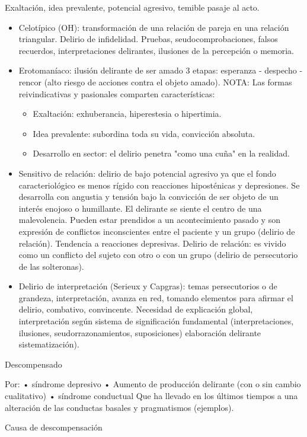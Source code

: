 \documentclass{scrbook}
\begin{document}
Exaltación, idea prevalente, potencial agresivo, temible pasaje al acto.
\begin{itemize}
	\item Celotípico (OH): transformación de una relación de pareja en una relación triangular. Delirio de infidelidad. Pruebas, seudocomprobaciones, falsos recuerdos, interpretaciones delirantes, ilusiones de la percepción o memoria.
	\item Erotomaníaco: ilusión delirante de ser amado 3 etapas: esperanza - despecho - rencor (alto riesgo de acciones contra el objeto amado). NOTA: Las formas reivindicativas y pasionales comparten características:
	\begin{itemize}
		\item Exaltación: exhuberancia, hiperestesia o hipertimia.
		\item Idea prevalente: subordina toda su vida, convicción absoluta.
		\item Desarrollo en sector: el delirio penetra "como una cuña" en la realidad.
	\end{itemize}
	\item  Sensitivo de relación: delirio de bajo potencial agresivo ya que el fondo caracteriológico es menos rígido con reacciones hiposténicas y depresiones. Se desarrolla con angustia y tensión bajo la convicción de ser objeto de un interés enojoso o humillante. El delirante se siente el centro de una malevolencia. Pueden estar prendidos a un acontecimiento pasado y son expresión de conflictos inconscientes entre el paciente y un grupo (delirio de relación). Tendencia a reacciones depresivas. Delirio de relación: es vivido como un conflicto del sujeto con otro o con un grupo (delirio de persecutorio de las solteronas).
	\item Delirio de interpretación (Serieux y Capgras): temas persecutorios o de grandeza, interpretación, avanza en red, tomando elementos para afirmar el delirio, combativo, convincente. Necesidad de explicación global, interpretación según sistema de significación fundamental (interpretaciones, ilusiones, seudorrazonamientos, suposiciones) elaboración delirante sistematización).
\end{itemize}
Descompensado

Por: • síndrome depresivo • Aumento de producción delirante (con o sin cambio cualitativo) • síndrome conductual Que ha llevado en los últimos tiempos a una alteración de las conductas basales y pragmatismos (ejemplos).

Causa de descompensación
\end{document}
